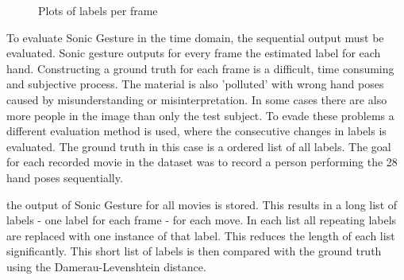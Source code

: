 \begin{figure}[htbp]
\center{}
\hspace{0.02\linewidth}
\hspace{0.02\linewidth}
\caption{Plots of labels per frame}
\label{fig:performances}
\end{figure}

To evaluate Sonic Gesture in the time domain, the sequential output must be evaluated. Sonic gesture outputs for every frame the estimated label for each hand. Constructing a ground truth for each frame is a difficult, time consuming and subjective process. The material is also 'polluted' with wrong hand poses caused by misunderstanding or misinterpretation. In some cases there are also more people in the image than only the test subject. To evade these problems a different evaluation method is used, where the consecutive changes in labels is evaluated. The ground truth in this case is a ordered list of all labels. The goal for each recorded movie in the dataset was to record a person performing the 28 hand poses sequentially.

the output of Sonic Gesture for all movies is stored. This results in a long list of labels - one label for each frame - for each move. In each list all repeating labels are replaced with one instance of that label. This reduces the length of each list significantly. This short list of labels is then compared with the ground truth using the Damerau-Levenshtein distance.


